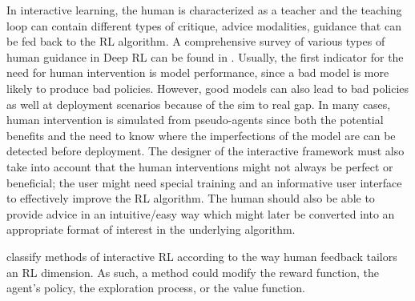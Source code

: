 \documentclass[twoside,11pt]{article}
\begin{document}


In interactive learning, the human is characterized as a teacher and the teaching loop can contain different types of critique, advice modalities, guidance that can be fed back to the RL algorithm. A comprehensive survey of various types of human guidance in Deep RL can be found in \cite{zhang2019leveraging}. Usually, the first indicator for the need for human intervention is model performance, since a bad model is more likely to produce bad policies. However, good models can also lead to bad policies as well at deployment scenarios because of the sim to real gap. In many cases, human intervention is simulated from pseudo-agents since both the potential benefits and the need to know where the imperfections of the model are can be detected before deployment. The designer of the interactive framework must also take into account that the human interventions might not always be perfect or beneficial; the user might need special training and an informative user interface to effectively improve the RL algorithm. The human should also be able to provide advice in an intuitive/easy way which might later be converted into an appropriate format of interest in the underlying algorithm.


\cite{Arzate:2020:SurveyInteractiveRL} classify methods of interactive RL according to the way human feedback tailors an RL dimension. As such, a method could modify the reward function, the agent's policy, the exploration process, or the value function. 
\end{document}
